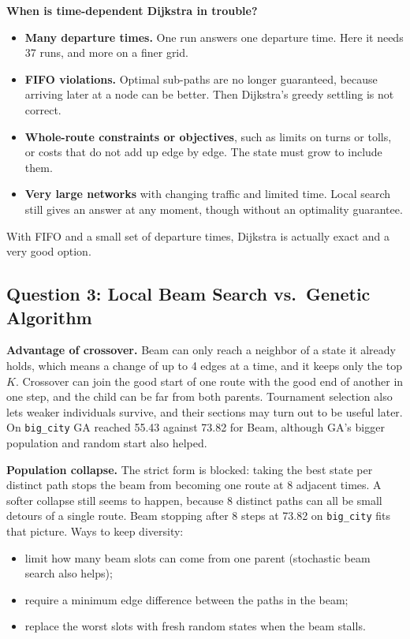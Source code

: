 \documentclass[11pt,a4paper]{article}
\newcommand{\col}[1]{\texttt{#1}}
\begin{document}
\textbf{When is time-dependent Dijkstra in trouble?}
\begin{itemize}
  \item \textbf{Many departure times.} One run answers one departure time. Here it needs 37 runs,
  and more on a finer grid.
  \item \textbf{FIFO violations.} Optimal sub-paths are no longer guaranteed, because arriving later
  at a node can be better. Then Dijkstra's greedy settling is not correct.
  \item \textbf{Whole-route constraints or objectives}, such as limits on turns or tolls, or costs
  that do not add up edge by edge. The state must grow to include them.
  \item \textbf{Very large networks} with changing traffic and limited time. Local search still gives
  an answer at any moment, though without an optimality guarantee.
\end{itemize}
With FIFO and a small set of departure times, Dijkstra is actually exact and a very good option.

\subsection*{Question 3: Local Beam Search vs.\ Genetic Algorithm}

\textbf{Advantage of crossover.} Beam can only reach a neighbor of a state it already holds, which
means a change of up to 4 edges at a time, and it keeps only the top $K$. Crossover can join the good
start of one route with the good end of another in one step, and the child can be far from both
parents. Tournament selection also lets weaker individuals survive, and their sections may turn out to
be useful later. On \col{big\_city} GA reached 55.43 against 73.82 for Beam, although GA's bigger
population and random start also helped.

\textbf{Population collapse.} The strict form is blocked: taking the best state per distinct path
stops the beam from becoming one route at 8 adjacent times. A softer collapse still seems to happen,
because 8 distinct paths can all be small detours of a single route. Beam stopping after 8 steps at
73.82 on \col{big\_city} fits that picture. Ways to keep diversity:
\begin{itemize}
  \item limit how many beam slots can come from one parent (stochastic beam search also helps);
  \item require a minimum edge difference between the paths in the beam;
  \item replace the worst slots with fresh random states when the beam stalls.
\end{itemize}
\end{document}
